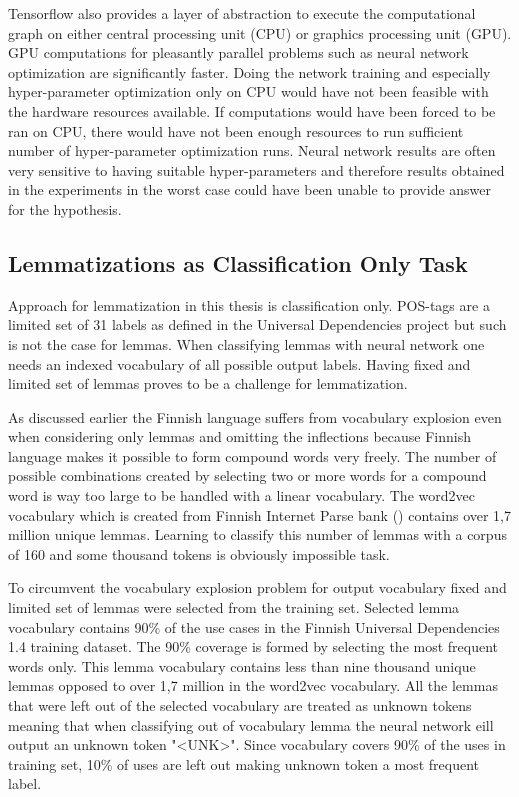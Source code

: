 \documentclass[12pt,a4paper,english
]{tutthesis}
\begin{document}
Tensorflow also provides a layer of abstraction to execute the computational graph on either central processing unit (CPU) or graphics processing unit (GPU). GPU computations for pleasantly parallel problems such as neural network optimization are significantly faster. Doing the network training and especially hyper-parameter optimization only on CPU would have not been feasible with the hardware resources available. If computations would have been forced to be ran on CPU, there would have not been enough resources to run sufficient number of hyper-parameter optimization runs. Neural network results are often very sensitive to having suitable hyper-parameters and therefore results obtained in the experiments in the worst case could have been unable to provide answer for the hypothesis.

\subsection{Lemmatizations as Classification Only Task}
\label{ss:lemmatization_as_classification_only_task}
Approach for lemmatization in this thesis is classification only. POS-tags are a limited set of 31 labels as defined in the Universal Dependencies project but such is not the case for lemmas. When classifying lemmas with neural network one needs an indexed vocabulary of all possible output labels. Having fixed and limited set of lemmas proves to be a challenge for lemmatization.

As discussed earlier the Finnish language suffers from vocabulary explosion even when considering only lemmas and omitting the inflections because Finnish language makes it possible to form compound words very freely. The number of possible combinations created by selecting two or more words for a compound word is way too large to be handled with a linear vocabulary. The word2vec vocabulary which is created from Finnish Internet Parse bank (\cite{Kanerva2014}) contains over 1,7 million unique lemmas. Learning to classify this number of lemmas with a corpus of 160 and some thousand tokens is obviously impossible task.

To circumvent the vocabulary explosion problem for output vocabulary fixed and limited set of lemmas were selected from the training set. Selected lemma vocabulary contains 90\% of the use cases in the Finnish Universal Dependencies 1.4 training dataset. The 90\% coverage is formed by selecting the most frequent words only. This lemma vocabulary contains less than nine thousand unique lemmas opposed to over 1,7 million in the word2vec vocabulary. All the lemmas that were left out of the selected vocabulary are treated as unknown tokens meaning that when classifying out of vocabulary lemma the neural network eill output an unknown token "<UNK>". Since vocabulary covers 90\% of the uses in training set, 10\% of uses are left out making unknown token a most frequent label.
\end{document}
